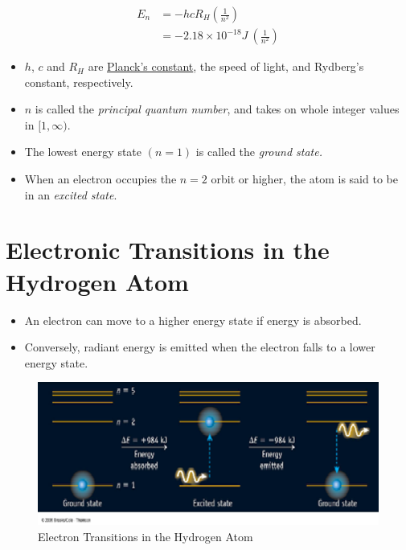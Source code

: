 \documentclass[
	chapter=7,
	title={Quantum Theory {\&} the Electronic Structure of Atoms},
	showanswers=true,
]{chem122notes}
\begin{document}
\begin{minipage}[m]{0.45\textwidth}
	\begin{equation}
		\begin{aligned}
			E_{n} &= -hcR_{H}\left( \frac{1}{n^{2}} \right)\\
			&= -2.18 \times 10^{-18} J\ \left( \frac{1}{n^{2}} \right)
		\end{aligned}
		\label{eq:bohr-energy-state}
	\end{equation}
	\begin{itemize}
		\item $h$, $c$ and $R_{H}$ are \hyperref[dfn:plancks-constant]{Planck's constant}, the speed of light, and Rydberg's constant, respectively.
		\item $n$ is called the \emph{principal quantum number}, and takes on whole integer values in $[1, \infty)$.
		\item The lowest energy state $(n=1)$ is called the \emph{ground state.}
		\item When an electron occupies the $n=2$ orbit or higher, the atom is said to be in an \emph{excited state}.
	\end{itemize}
\end{minipage}

\section{Electronic Transitions in the Hydrogen Atom}\label{sec:electronic-transitions-in-the-hydrogen-atom}
\begin{itemize}
	\item An electron can move to a higher energy state if energy is absorbed.
	\item Conversely, radiant energy is emitted when the electron falls to a lower energy state.
\end{itemize}

\begin{figure}[H]
	\centering
	\includegraphics[width=\textwidth]{chapter7/electron_transitions}
	\caption{Electron Transitions in the Hydrogen Atom}
	\label{fig:electron-transitions}
\end{figure}
\end{document}
